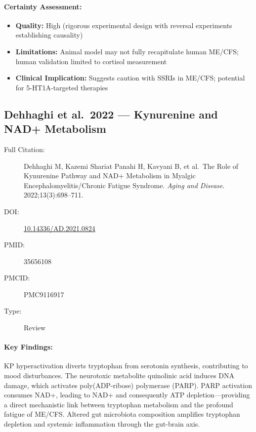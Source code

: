 \paragraph{Certainty Assessment:}
\begin{itemize}
    \item \textbf{Quality:} High (rigorous experimental design with reversal experiments establishing causality)
    \item \textbf{Limitations:} Animal model may not fully recapitulate human ME/CFS; human validation limited to cortisol measurement
    \item \textbf{Clinical Implication:} Suggests caution with SSRIs in ME/CFS; potential for 5-HT1A-targeted therapies
\end{itemize}

\subsection{Dehhaghi et al.\ 2022 --- Kynurenine and NAD+ Metabolism}

\begin{description}
    \item[Full Citation:] Dehhaghi M, Kazemi Shariat Panahi H, Kavyani B, et al.\ The Role of Kynurenine Pathway and NAD+ Metabolism in Myalgic Encephalomyelitis/Chronic Fatigue Syndrome. \textit{Aging and Disease}. 2022;13(3):698--711.
    \item[DOI:] \href{https://doi.org/10.14336/AD.2021.0824}{10.14336/AD.2021.0824}
    \item[PMID:] 35656108
    \item[PMCID:] PMC9116917
    \item[Type:] Review
\end{description}

\paragraph{Key Findings:}
KP hyperactivation diverts tryptophan from serotonin synthesis, contributing to mood disturbances. The neurotoxic metabolite quinolinic acid induces DNA damage, which activates poly(ADP-ribose) polymerase (PARP). PARP activation consumes NAD+, leading to NAD+ and consequently ATP depletion---providing a direct mechanistic link between tryptophan metabolism and the profound fatigue of ME/CFS. Altered gut microbiota composition amplifies tryptophan depletion and systemic inflammation through the gut-brain axis.

